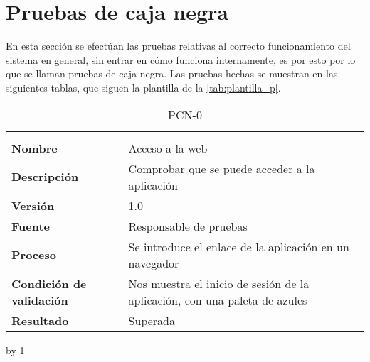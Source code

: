 \section{Pruebas de caja negra}\label{sec:pruebas-de-caja-negra}
En esta sección se efectúan las pruebas relativas al correcto funcionamiento del sistema en general, sin entrar en cómo funciona internamente, es por esto por lo que se llaman pruebas de caja negra. Las pruebas hechas se muestran en las siguientes tablas, que siguen la plantilla de la \autoref{tab:plantilla_p}.
\newcount\pcn
{}
\begin{table}[H]
	\caption{PCN-0\number\pcn}
	\begin{tabular}{|l|p{}|}
		\hline
		\multicolumn{2}{|c|}{\cellcolor[HTML]{BFBFBF}{\color[HTML]{000000} \textbf{PCN-0\number\pcn}}} \\ \hline
		\textbf{Nombre}                  & Acceso a la web                                                            \\ \hline
		\textbf{Descripción}             & Comprobar que se puede acceder a la aplicación                             \\ \hline
		\textbf{Versión}                 & 1.0                                                                        \\ \hline
		\textbf{Fuente}                  & Responsable de pruebas                                                     \\ \hline
		\textbf{Proceso}                 & Se introduce el enlace de la aplicación en un navegador                    \\ \hline
		\textbf{Condición de validación} & Nos muestra el inicio de sesión de la aplicación, con una paleta de azules \\ \hline
		\textbf{Resultado}               & Superada                                                                   \\ \hline
	\end{tabular}
\end{table}
\advance\pcn by 1
